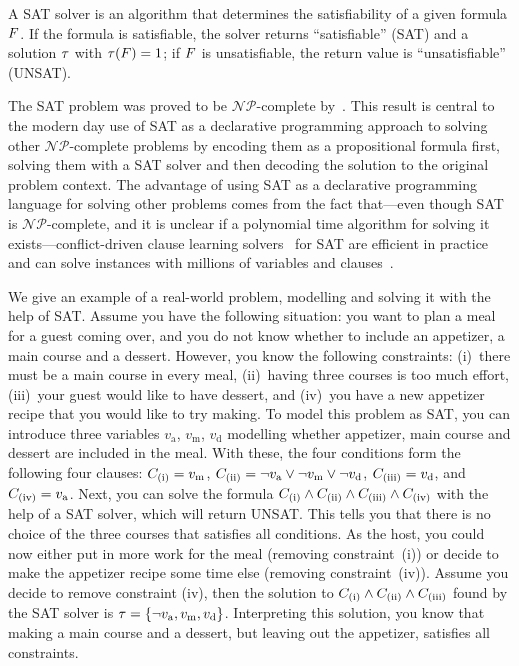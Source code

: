 A SAT solver is an algorithm that determines the satisfiability of a given formula $F$.
If the formula is satisfiable, the solver returns ``satisfiable'' (SAT) and a solution $\tau$ with $\tau(F)=1$;
if $F$ is unsatisfiable, the return value is ``unsatisfiable'' (UNSAT).

The SAT problem was proved to be $\mathcal{NP}$-complete by~\textcite{DBLP:conf/stoc/Cook71}.
This result is central to the modern day use of SAT as a declarative programming approach to solving other $\mathcal{NP}$-complete problems by encoding them as a propositional formula first, solving them with a SAT solver and then decoding the solution to the original problem context.
The advantage of using SAT as a declarative programming language for solving other problems comes from the fact that---even though SAT is $\mathcal{NP}$-complete, and it is unclear if a polynomial time algorithm for solving it exists---conflict-driven clause learning solvers~\autocite{handbook2-cdcl} for SAT are efficient in practice and can solve instances with millions of variables and clauses~\autocite{}.

\begin{example}\label{ex:sat-modelling}
  We give an example of a real-world problem, modelling and solving it with the help of SAT.
  Assume you have the following situation:
  you want to plan a meal for a guest coming over, and you do not know whether to include an appetizer, a main course and a dessert.
  However, you know the following constraints:
  (i)~there must be a main course in every meal, (ii)~having three courses is too much effort, (iii)~your guest would like to have dessert, and (iv)~you have a new appetizer recipe that you would like to try making.
  To model this problem as SAT, you can introduce three variables $v_\text{a}$, $v_\text{m}$, $v_\text{d}$ modelling whether appetizer, main course and dessert are included in the meal.
  With these, the four conditions form the following four clauses:
  $C_\text{(i)} = v_\text{m}$, $C_\text{(ii)} = \lnot v_\text{a} \lor \lnot v_\text{m} \lor \lnot v_\text{d}$, $C_\text{(iii)} = v_\text{d}$, and $C_\text{(iv)} = v_\text{a}$.
  Next, you can solve the formula $C_\text{(i)} \land C_\text{(ii)} \land C_\text{(iii)} \land C_\text{(iv)}$ with the help of a SAT solver, which will return UNSAT.
  This tells you that there is no choice of the three courses that satisfies all conditions.
  As the host, you could now either put in more work for the meal (removing constraint~(i)) or decide to make the appetizer recipe some time else (removing constraint~(iv)).
  Assume you decide to remove constraint (iv), then the solution to $C_\text{(i)} \land C_\text{(ii)} \land C_\text{(iii)}$ found by the SAT solver is $\tau = \{ \lnot v_\text{a}, v_\text{m}, v_\text{d} \}$.
  Interpreting this solution, you know that making a main course and a dessert, but leaving out the appetizer, satisfies all constraints.
\end{example}

